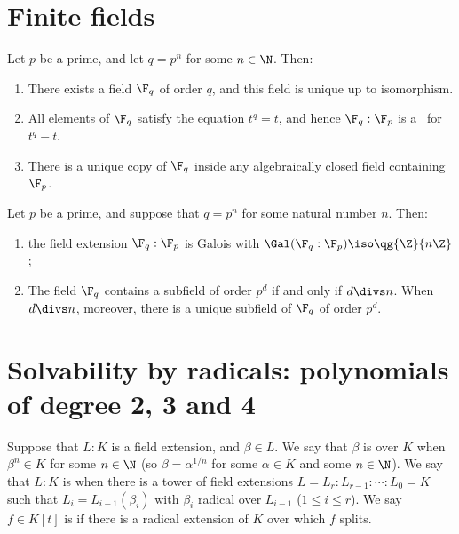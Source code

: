 \documentclass{article}
\begin{document}
\section{Finite fields}
  \begin{ttheorem}
    Let \( p \) be a prime, and let \( q=p^n \) for some \( n\in \N \).
    Then: \begin{enumerate}[label=(\alph*)]
      \item There exists a field \( \F_q \) of order \( q \), and this field is unique up to isomorphism.
      \item All elements of \( \F_q \) satisfy the equation \( t^q=t \), and hence \( \F_q:\F_p \) is a \sfe~for \( t^q-t \).
      \item There is a unique copy of \( \F_q \) inside any algebraically closed field containing \( \F_p \).
    \end{enumerate}
  \end{ttheorem}

  \begin{ttheorem}
    Let \( p \) be a prime, and suppose that \( q=p^n \) for some natural number \( n \).
    Then: \begin{enumerate}[label=(\alph*)]
      \item the field extension \( \F_q:\F_p \) is Galois with \( \Gal(\F_q:\F_p)\iso \qg{\Z}{n\Z} \);
      \item The field \( \F_q \) contains a subfield of order \( p^d \) if and only if \( d\divs n \).
        When \( d\divs n \), moreover, there is a unique subfield of \( \F_q \) of order \( p^d \).
    \end{enumerate}
  \end{ttheorem}

\section{Solvability by radicals: polynomials of degree 2, 3 and 4}
  \begin{tdefinition}
    Suppose that \( L:K \) is a field extension, and \( \beta\in L \).
    We say that \( \beta \) is  over \( K \) when \( \beta^n\in K \) for some \( n\in \N \) (so \( \beta=\alpha^{1/n} \) for some \( \alpha\in K \) and some \( n\in\N \)).
    We say that \( L:K \) is  when there is a tower of field extensions \( L=L_r:L_{r-1}:\cdots:L_0=K \) such that \( L_i=L_{i-1}(\beta_i) \) with \( \beta_i \) radical over \( L_{i-1} \) (\( 1\leq i\leq r \)).
    We say \( f\in K[t] \) is  if there is a radical extension of \( K \) over which \( f \) splits.
  \end{tdefinition}
\end{document}

